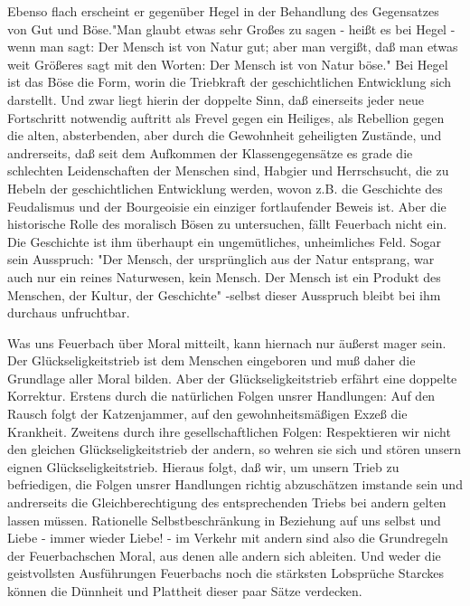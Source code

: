 Ebenso flach erscheint er gegenüber Hegel in der Behandlung des
Gegensatzes von Gut und Böse."Man glaubt etwas sehr Großes zu sagen -
heißt es bei Hegel - wenn man sagt: Der Mensch ist von Natur gut; aber
man vergißt, daß man etwas weit Größeres sagt mit den Worten: Der Mensch
ist von Natur böse." Bei Hegel ist das Böse die Form, worin die
Triebkraft der geschichtlichen Entwicklung sich darstellt. Und zwar
liegt hierin der doppelte Sinn, daß einerseits jeder neue Fortschritt
notwendig auftritt als Frevel gegen ein Heiliges, als Rebellion gegen
die alten, absterbenden, aber durch die Gewohnheit geheiligten Zustände,
und andrerseits, daß seit dem Aufkommen der Klassengegensätze es grade
die schlechten Leidenschaften der Menschen sind, Habgier und
Herrschsucht, die zu Hebeln der geschichtlichen Entwicklung werden,
wovon z.B. die Geschichte des Feudalismus und der Bourgeoisie ein
einziger fortlaufender Beweis ist. Aber die historische Rolle des
moralisch Bösen zu untersuchen, fällt Feuerbach nicht ein. Die
Geschichte ist ihm überhaupt ein ungemütliches, unheimliches Feld. Sogar
sein Ausspruch: "Der Mensch, der ursprünglich aus der Natur entsprang,
war auch nur ein reines Naturwesen, kein Mensch. Der Mensch ist ein
Produkt des Menschen, der Kultur, der Geschichte" -selbst dieser
Ausspruch bleibt bei ihm durchaus unfruchtbar.

Was uns Feuerbach über Moral mitteilt, kann hiernach nur äußerst
mager sein. Der Glückseligkeitstrieb ist dem Menschen eingeboren und muß
daher die Grundlage aller Moral bilden. Aber der Glückseligkeitstrieb
erfährt eine doppelte Korrektur. Erstens durch die natürlichen Folgen
unsrer Handlungen: Auf den Rausch folgt der Katzenjammer, auf den
gewohnheitsmäßigen Exzeß die Krankheit. Zweitens durch ihre
gesellschaftlichen Folgen: Respektieren wir nicht den gleichen
Glückseligkeitstrieb der andern, so wehren sie sich und stören unsern
eignen Glückseligkeitstrieb. Hieraus folgt, daß wir, um unsern Trieb zu
befriedigen, die Folgen unsrer Handlungen richtig abzuschätzen imstande
sein und andrerseits die Gleichberechtigung des entsprechenden Triebs
bei andern gelten lassen müssen. Rationelle Selbstbeschränkung in
Beziehung auf uns selbst und Liebe - immer wieder Liebe! - im Verkehr
mit andern sind also die Grundregeln der Feuerbachschen Moral, aus denen
alle andern sich ableiten. Und weder die geistvollsten Ausführungen
Feuerbachs noch die stärksten Lobsprüche Starckes können die Dünnheit
und Plattheit dieser paar Sätze verdecken.

